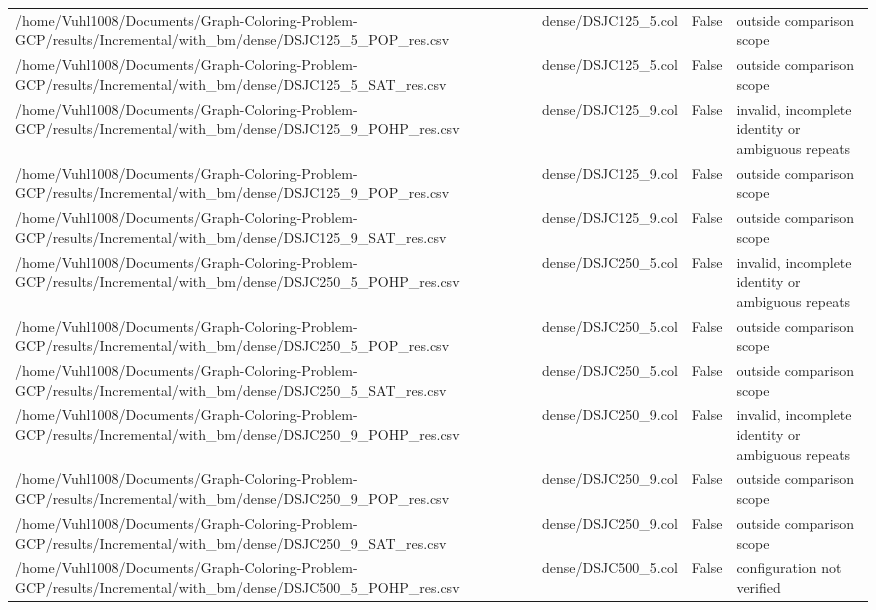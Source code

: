 \begin{table}[htbp]
\begin{tabular}{llll}
/home/Vuhl1008/Documents/Graph-Coloring-Problem-GCP/results/Incremental/with\_bm/dense/DSJC125\_5\_POP\_res.csv & dense/DSJC125\_5.col & False & outside comparison scope \\
/home/Vuhl1008/Documents/Graph-Coloring-Problem-GCP/results/Incremental/with\_bm/dense/DSJC125\_5\_SAT\_res.csv & dense/DSJC125\_5.col & False & outside comparison scope \\
/home/Vuhl1008/Documents/Graph-Coloring-Problem-GCP/results/Incremental/with\_bm/dense/DSJC125\_9\_POHP\_res.csv & dense/DSJC125\_9.col & False & invalid, incomplete identity or ambiguous repeats \\
/home/Vuhl1008/Documents/Graph-Coloring-Problem-GCP/results/Incremental/with\_bm/dense/DSJC125\_9\_POP\_res.csv & dense/DSJC125\_9.col & False & outside comparison scope \\
/home/Vuhl1008/Documents/Graph-Coloring-Problem-GCP/results/Incremental/with\_bm/dense/DSJC125\_9\_SAT\_res.csv & dense/DSJC125\_9.col & False & outside comparison scope \\
/home/Vuhl1008/Documents/Graph-Coloring-Problem-GCP/results/Incremental/with\_bm/dense/DSJC250\_5\_POHP\_res.csv & dense/DSJC250\_5.col & False & invalid, incomplete identity or ambiguous repeats \\
/home/Vuhl1008/Documents/Graph-Coloring-Problem-GCP/results/Incremental/with\_bm/dense/DSJC250\_5\_POP\_res.csv & dense/DSJC250\_5.col & False & outside comparison scope \\
/home/Vuhl1008/Documents/Graph-Coloring-Problem-GCP/results/Incremental/with\_bm/dense/DSJC250\_5\_SAT\_res.csv & dense/DSJC250\_5.col & False & outside comparison scope \\
/home/Vuhl1008/Documents/Graph-Coloring-Problem-GCP/results/Incremental/with\_bm/dense/DSJC250\_9\_POHP\_res.csv & dense/DSJC250\_9.col & False & invalid, incomplete identity or ambiguous repeats \\
/home/Vuhl1008/Documents/Graph-Coloring-Problem-GCP/results/Incremental/with\_bm/dense/DSJC250\_9\_POP\_res.csv & dense/DSJC250\_9.col & False & outside comparison scope \\
/home/Vuhl1008/Documents/Graph-Coloring-Problem-GCP/results/Incremental/with\_bm/dense/DSJC250\_9\_SAT\_res.csv & dense/DSJC250\_9.col & False & outside comparison scope \\
/home/Vuhl1008/Documents/Graph-Coloring-Problem-GCP/results/Incremental/with\_bm/dense/DSJC500\_5\_POHP\_res.csv & dense/DSJC500\_5.col & False & configuration not verified \\

\end{tabular}
\end{table}
